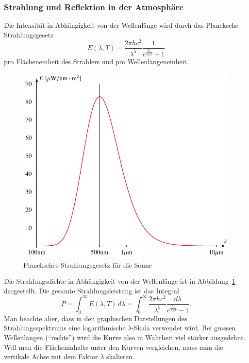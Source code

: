 \subsubsection{Strahlung und Reflektion in der Atmosphäre}
Die Intensität in Abhängigkeit von der Wellenlänge wird durch das Plancksche
Strahlungsgesetz
\begin{equation}
E(\lambda,T)
=
\frac{2\pi hc^2}{\lambda^5}\frac{1}{e^{\frac{hc}{\lambda kT}}-1}
\end{equation}
pro Flächeneinheit des Strahlers und pro Wellenlängeneinheit.
\begin{figure}
\centering
\includegraphics{chapters/1/planck.pdf}
\caption{Plancksches Strahlungsgesetz für die Sonne
\label{skript:planck-kurve}}
\end{figure}
Die Strahlungsdichte in Abhängigkeit von der Wellenlänge ist in
Abbildung~\ref{skript:planck-kurve} dargestellt.
Die gesamte Strahlungsleistung ist das Integral
\[
P
=
\int_{0}^\infty E(\lambda,T)\,d\lambda
=
\int_{0}^\infty 
\frac{2\pi hc^2}{\lambda^5}\frac{d\lambda}{e^{\frac{hc}{\lambda kT}}-1}.
\]
Man beachte aber, dass in den graphischen Darstellungen des
Strahlungsspektrums eine logarithmische $\lambda$-Skala
verwendet wird.
Bei grossen Wellenlängen (``rechts'') wird die Kurve also in Wahrheit
viel stärker ausgedehnt.
Will man die Flächeninhalte unter den Kurven vergleichen, muss man
die vertikale Achse mit dem Faktor $\lambda$ skalieren.

